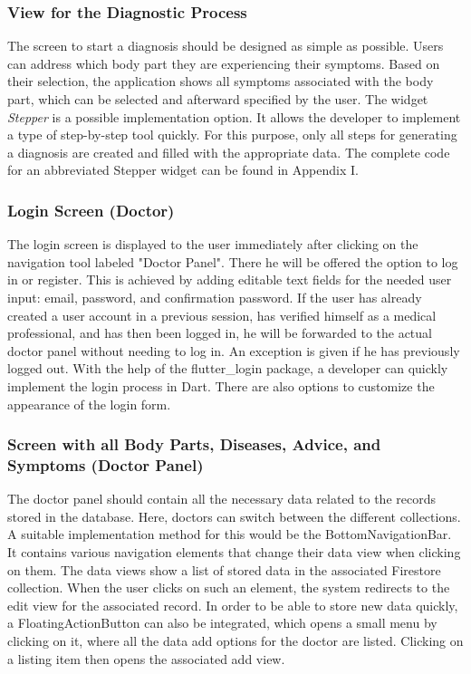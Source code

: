 \subsubsection{\textbf{View for the Diagnostic Process}}
The screen to start a diagnosis should be designed as simple as possible. Users can address which body part they are experiencing their symptoms. Based on their selection, the application shows all symptoms associated with the body part, which can be selected and afterward specified by the user. The widget \textit{Stepper} is a possible implementation option. It allows the developer to implement a type of step-by-step tool quickly. For this purpose, only all steps for generating a diagnosis are created and filled with the appropriate data. The complete code for an abbreviated Stepper widget can be found in Appendix I.

\subsubsection{\textbf{Login Screen (Doctor)}}
The login screen is displayed to the user immediately after clicking on the navigation tool labeled "Doctor Panel". There he will be offered the option to log in or register. This is achieved by adding editable text fields for the needed user input: email, password, and confirmation password. If the user has already created a user account in a previous session, has verified himself as a medical professional, and has then been logged in, he will be forwarded to the actual doctor panel without needing to log in. An exception is given if he has previously logged out. With the help of the flutter\_login package, a developer can quickly implement the login process in Dart. There are also options to customize the appearance of the login form.

\subsubsection{\textbf{Screen with all Body Parts, Diseases, Advice, and Symptoms (Doctor Panel)}}
The doctor panel should contain all the necessary data related to the records stored in the database. Here, doctors can switch between the different collections. A suitable implementation method for this would be the BottomNavigationBar. It contains various navigation elements that change their data view when clicking on them. The data views show a list of stored data in the associated Firestore collection. When the user clicks on such an element, the system redirects to the edit view for the associated record. In order to be able to store new data quickly, a FloatingActionButton can also be integrated, which opens a small menu by clicking on it, where all the data add options for the doctor are listed. Clicking on a listing item then opens the associated add view.

